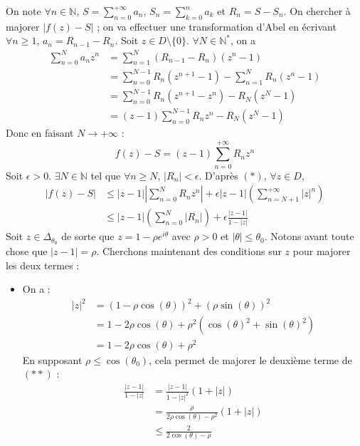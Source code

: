 	\begin{demonstration}
		On note $\forall n \in \mathbb{N}$, $S = \sum_{n=0}^{+\infty} a_n$, $S_n = \sum_{k=0}^n a_k$ et $R_n = S - S_n$. On chercher à majorer $|f(z) - S|$ ; on va effectuer une transformation d'Abel en écrivant $\forall n \geq 1$, $a_n = R_{n-1} - R_n$. Soit $z \in D \setminus \{ 0 \}$. $\forall N \in \mathbb{N}^*$, on a
		\begin{align*}
			\sum_{n=0}^N a_n z^n &= \sum_{n=1}^N (R_{n-1} - R_n)(z^n - 1) \\
			&= \sum_{n=0}^{N-1} R_n(z^{n+1} - 1) - \sum_{n=1}^N R_n(z^n - 1) \\
			&= \sum_{n=0}^{N-1} R_n(z^{n+1} - z^n) - R_N(z^N - 1) \\
			&= (z-1) \sum_{n=0}^{N-1} R_nz^n - R_N(z^N - 1)
		\end{align*}
		Donc en faisant $N \rightarrow +\infty$ :
		\[ f(z) - S = (z-1) \sum_{n=0}^{+\infty} R_nz^n \tag{$*$} \]
		Soit $\epsilon > 0$. $\exists N \in \mathbb{N}$ tel que $\forall n \geq N$, $|R_n| < \epsilon$. D'après $(*)$, $\forall z \in D$,
		\begin{align*}
			|f(z)-S| &\leq |z-1| \left| \sum_{n=0}^N R_n z^n \right| + \epsilon |z-1| \left( \sum_{n=N+1}^{+\infty} |z|^n \right) \\
			&\leq |z-1| \left( \sum_{n=0}^N |R_n| \right) + \epsilon \frac{|z-1|}{1-|z|} \tag{$**$}
		\end{align*}
		Soit $z \in \Delta_{\theta_0}$ de sorte que $z = 1-\rho e^{i\theta}$ avec $\rho > 0$ et $|\theta| \leq \theta_0$. Notons avant toute chose que $|z-1| = \rho$. Cherchons maintenant des conditions sur $z$ pour majorer les deux termes :
		\begin{itemize}
			\item On a :
			\begin{align*}
				|z|^2 &= (1 - \rho \cos(\theta))^2 + (\rho \sin(\theta))^2 \\
				&= 1 - 2 \rho \cos(\theta) + \rho^2 (\cos(\theta)^2 + \sin(\theta)^2) \\
				&= 1 - 2 \rho \cos(\theta) + \rho^2
			\end{align*}
			En supposant $\rho \leq \cos(\theta_0)$, cela permet de majorer le deuxième terme de $(**)$ :
			\begin{align*}
				\frac{|z-1|}{1-|z|} &= \frac{|z-1|}{1-|z|^2}(1+|z|) \\
				&= \frac{\rho}{2 \rho \cos(\theta) - \rho^2}(1+|z|) \\
				&\leq \frac{2}{2\cos(\theta) - \rho} \\

\end{align*}
\end{itemize}
\end{demonstration}
